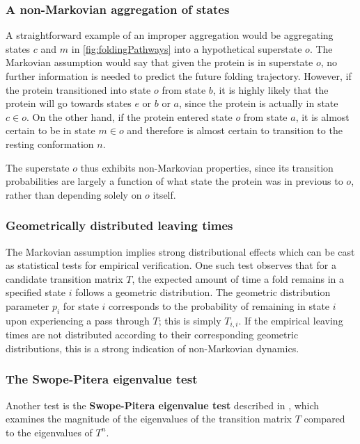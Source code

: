 \documentclass{article}
\begin{document}
\subsubsection{A non-Markovian aggregation of states}
A straightforward example of an improper aggregation would be aggregating states $c$ and $m$ in \autoref{fig:foldingPathways} into a hypothetical superstate $o$. The Markovian assumption would say that given the protein is in superstate $o$, no further information is needed to predict the future folding trajectory. However, if the protein transitioned into state $o$ from state $b$, it is highly likely that the protein will go towards states $e$ or $b$ or $a$, since the protein is actually in state $c \in o$. On the other hand, if the protein entered state $o$ from state $a$, it is almost certain to be in state $m \in o$ and therefore is almost certain to transition to the resting conformation $n$.

The superstate $o$ thus exhibits non-Markovian properties, since its transition probabilities are largely a function of what state the protein was in previous to $o$, rather than depending solely on $o$ itself.

\subsubsection{Geometrically distributed leaving times}
The Markovian assumption implies strong distributional effects which can be cast as statistical tests for empirical verification. One such test observes that for a candidate transition matrix $T$, the expected amount of time a fold remains in a specified state $i$ follows a geometric distribution. The geometric distribution parameter $p_i$ for state $i$ corresponds to the probability of remaining in state $i$ upon experiencing a pass through $T$; this is simply $T_{i,i}$. If the empirical leaving times are not distributed according to their corresponding geometric distributions, this is a strong indication of non-Markovian dynamics.

\subsubsection{The Swope-Pitera eigenvalue test}
Another test is the \textbf{Swope-Pitera eigenvalue test} described in \cite{swopepitera}, which examines the magnitude of the eigenvalues of the transition matrix $T$ compared to the eigenvalues of $T^n$. 
\end{document}
